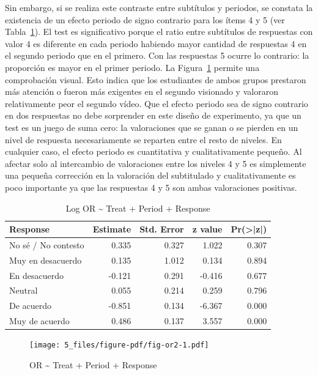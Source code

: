 \documentclass[
  12pt,
  a4paper,
  extrafontsizes,
  onecolumn,
  openright,
  table]{memoir}
\begin{document}
Sin embargo, si se realiza este contraste entre subtítulos y periodos,
se constata la existencia de un \gls{efecto periodo} de signo contrario
para los ítems 4 y 5 (ver Tabla~\ref{tbl-logor2}). El test es
significativo porque el ratio entre subtítulos de respuestas con valor 4
es diferente en cada periodo habiendo mayor cantidad de respuestas 4 en
el segundo periodo que en el primero. Con las respuestas 5 ocurre lo
contrario: la proporción es mayor en el primer periodo. La
Figura~\ref{fig-or2} permite una comprobación visual. Esto indica que
los estudiantes de ambos grupos prestaron más atención o fueron más
exigentes en el segundo visionado y valoraron relativamente peor el
segundo vídeo. Que el efecto periodo sea de signo contrario en dos
respuestas no debe sorprender en este diseño de experimento, ya que un
test es un juego de suma cero: la valoraciones que se ganan o se pierden
en un nivel de respuesta necesariamente se reparten entre el resto de
niveles. En cualquier caso, el efecto periodo es cuantitativa y
cualitativamente pequeño. Al afectar solo al intercambio de valoraciones
entre los niveles 4 y 5 es simplemente una pequeña corrección en la
valoración del subtitulado y cualitativamente es poco importante ya que
las respuestas 4 y 5 son ambas valoraciones positivas.

\hypertarget{tbl-logor2}{}
\begin{longtable}{lrrrr}
\caption{\label{tbl-logor2}Log OR \textasciitilde{} Treat + Period + Response }\tabularnewline

\toprule
Response & Estimate & Std. Error & z value & Pr(>|z|) \\ 
\midrule
No sé / No contesto & 0.335 & 0.327 & 1.022 & 0.307 \\ 
Muy en desacuerdo & 0.135 & 1.012 & 0.134 & 0.894 \\ 
En desacuerdo & -0.121 & 0.291 & -0.416 & 0.677 \\ 
Neutral & 0.055 & 0.214 & 0.259 & 0.796 \\ 
De acuerdo & -0.851 & 0.134 & -6.367 & 0.000 \\ 
Muy de acuerdo & 0.486 & 0.137 & 3.557 & 0.000 \\ 
\bottomrule
\end{longtable}

\begin{figure}[h]

{\centering \texttt{[image: 5\_files/figure-pdf/fig-or2-1.pdf]}

}

\caption[Test Odds Ratio \textasciitilde{} Treat + Period +
Response]{\label{fig-or2}OR \textasciitilde{} Treat + Period + Response}

\end{figure}
\end{document}
